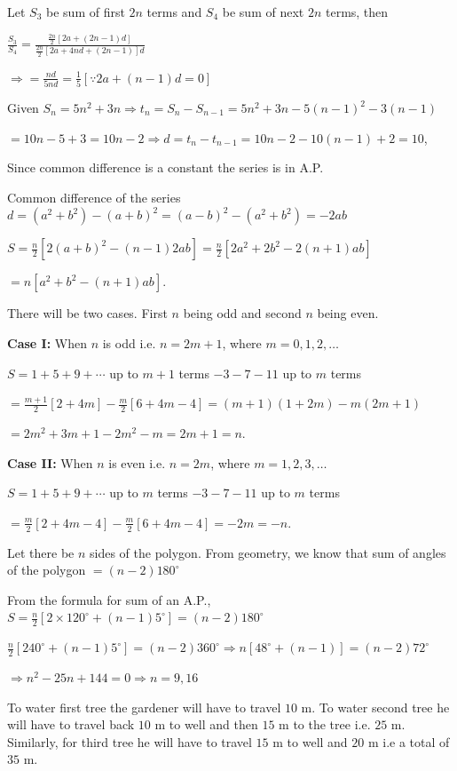   Let $S_3$ be sum of first $2n$ terms and $S_4$ be sum of next $2n$ terms, then

  $\frac{S_3}{S_4} = \frac{\tfrac{2n}{2}[2a + (2n - 1)d]}{\tfrac{2n}{2}[2a + 4nd + (2n - 1)]d}$

  $\Rightarrow = \frac{nd}{5nd} = \frac{1}{5}[\because 2a + (n - 1)d = 0]$
\item Given $S_n = 5n^2 + 3n \Rightarrow t_n = S_n - S_{n - 1} = 5n^2 + 3n - 5(n - 1)^2 - 3(n - 1)$

  $= 10n - 5 + 3 = 10n - 2 \Rightarrow d = t_n - t_{n - 1} = 10n - 2 - 10(n - 1) + 2 = 10$,

  Since common difference is a constant the series is in A.P.
\item Common difference of the series $d = (a^2 + b^2) - (a + b)^2 = (a - b)^2 - (a^2 + b^2) = -2ab$

  $S = \frac{n}{2}[2(a + b)^2 - (n - 1)2ab] = \frac{n}{2}[2a^2 + 2b^2 - 2(n + 1)ab]$

  $= n[a^2 + b^2 - (n + 1)ab]$.
\item There will be two cases. First $n$ being odd and second $n$ being even.

  {\bf Case I:} When $n$ is odd i.e. $n = 2m + 1$, where $m = 0, 1, 2, \ldots$

  $S = 1 + 5 + 9 + \cdots$ up to $m + 1$ terms $- 3 - 7 - 11$ up to $m$ terms

  $= \frac{m + 1}{2}[2 + 4m] - \frac{m}{2}[6 + 4m - 4] = (m + 1)(1 + 2m) - m(2m + 1)$

  $= 2m^2 + 3m + 1 - 2m^2 - m = 2m + 1 = n$.

  {\bf Case II:} When $n$ is even i.e. $n = 2m$, where $m =1, 2, 3, \ldots$

  $S = 1 + 5 + 9 + \cdots$ up to $m$ terms $- 3 - 7 - 11$ up to $m$ terms

  $= \frac{m}{2}[2 + 4m - 4] - \frac{m}{2}[6 + 4m - 4] = -2m = -n$.
\item Let there be $n$ sides of the polygon. From geometry, we know that sum of angles of the polygon $= (n - 2)180^\circ$

  From the formula for sum of an A.P., $S = \frac{n}{2}[2\times120^\circ + (n - 1)5^\circ] = (n - 2)180^\circ$

  $\frac{n}{2}[240^\circ + (n - 1)5^\circ] = (n - 2)360^\circ\Rightarrow n[48^\circ + (n - 1)] = (n - 2)72^\circ$

  $\Rightarrow n^2 - 25n + 144 = 0 \Rightarrow n = 9, 16$
\item To water first tree the gardener will have to travel $10$ m. To water second tree he will
  have to travel back $10$ m to well and then $15$ m to the tree i.e. $25$ m. Similarly, for third tree he will
  have to travel $15$ m to well and $20$ m i.e a total of $35$ m.

